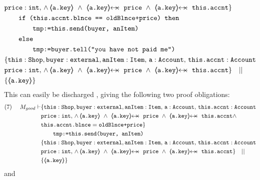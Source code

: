 \begin{proofO}
\begin{align*}
				& \prg{price} : \prg{int},\,
				  \wedge\, 
				  {\inside{\prg{a.key}}}\ \wedge\ 
				  \protectedFrom{\prg{a.key}}{\prg{price}}\ \wedge\ 
				   \protectedFrom{\prg{a.key}}{\prg{this.accnt}}\} \\
		  		&\SPTG \prg{if (this.accnt.blnce == oldBlnce+price) then} \\
				 &\SPTG \SPTG \prg{tmp:=this.send(buyer, anItem)}\ \\  
				&\SPTG  \prg{else} \\
				 &\SPTG\SPTG  \prg{tmp:=buyer.tell("you have not paid me")}\\
		  		& \{  \prg{this}:\prg{Shop}, \prg{buyer} : \prg{external}, \prg{anItem} : \prg{Item},\, \prg{a}:\prg{Account},\, \prg{this.accnt}:\prg{Account}\\
				& \prg{price} : \prg{int},\,
				  \wedge\, 
				  {\inside{\prg{a.key}}}\ \wedge\ 
				  \protectedFrom{\prg{a.key}}{\prg{price}}\ \wedge\ 
				   \protectedFrom{\prg{a.key}}{\prg{this.accnt}}\} \ \ \  || \ \ \ \\
		  		& \{ {\inside{\prg{a.key}}} \}
\end{align*}
\normalsize
This can easily be discharged \sdN{using   {\sc{If\_Rule}}}, giving the following two proof obligations:
\small
\begin{align*}
\text{(7)}  \ \ \ \ M_{good} \vdash & \{  \prg{this}:\prg{Shop}, \prg{buyer} : \prg{external}, \prg{anItem} : \prg{Item},\, \prg{a}:\prg{Account},\, \prg{this.accnt}:\prg{Account}\\
				& \prg{price} : \prg{int},\,
				  \wedge\, 
				  {\inside{\prg{a.key}}}\ \wedge\ 
				  \protectedFrom{\prg{a.key}}{\prg{price}}\ \wedge\ 
				   \protectedFrom{\prg{a.key}}{\prg{this.accnt}} \wedge \\
				&  \prg{this.accnt.blnce} = \prg{oldBlnce+price}\} \\
		  		&\SPTG  \prg{tmp:=this.send(buyer, anItem)}\ \\  
		  		& \{  \prg{this}:\prg{Shop}, \prg{buyer} : \prg{external}, \prg{anItem} : \prg{Item},\, \prg{a}:\prg{Account},\, \prg{this.accnt}:\prg{Account}\\
				& \prg{price} : \prg{int},\,
				  \wedge\, 
				  {\inside{\prg{a.key}}}\ \wedge\ 
				  \protectedFrom{\prg{a.key}}{\prg{price}}\ \wedge\ 
				   \protectedFrom{\prg{a.key}}{\prg{this.accnt}}\} \ \ \  || \ \ \ \\
		  		& \{ {\inside{\prg{a.key}}} \}
\end{align*}
\normalsize
and 
\small
\begin{align*}

\end{align*}
\end{proofO}
